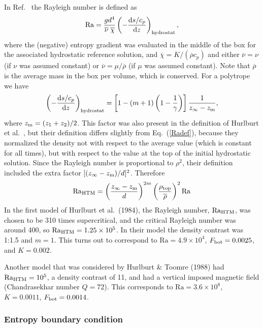 \documentclass[\mydriver,12pt,twoside,notitlepage,a4paper]{article}
\newcommand{\Ra}            {\mathrm{Ra}}
\begin{document}
In Ref.~\cite{BJNRST96} the Rayleigh number is defined as
\begin{equation}\label{Radef}
  \Ra = {gd^4\over\overline{\nu}\;\overline{\chi}}
\left(-{\mbox{d}s/c_p\over\mbox{d}z}\right)_{\rm hydrostat},
\end{equation}
where the (negative) entropy gradient was evaluated in the middle
of the box for the associated hydrostatic reference solution, and
$\overline\chi=K/(\overline\rho c_p)$ and either $\overline\nu=\nu$
(if $\nu$ was assumed constant) or $\overline\nu=\mu/\overline\rho$
(if $\mu$ was assumed constant). Note that $\overline\rho$ is the average
mass in the box per volume, which is conserved. For a polytrope we have
\begin{equation}\label{sgradient}
\left(-{\mbox{d}s/c_p\over\mbox{d}z}\right)_{\rm hydrostat}
=\left[1-(m+1)\left(1-{1\over\gamma}\right)\right]
{1\over z_{\infty}-z_{\rm m}},
\end{equation}
where $z_{\rm m}=(z_1+z_2)/2$. This factor was also present in
the definition of Hurlburt et al.\ \cite{HTM84}, but their definition
differs slightly from Eq.~(\ref{Radef}), because they normalized the
density not with respect to the average value (which is constant for
all times), but with respect to the value at the top of the initial
hydrostatic solution. Since the Rayleigh number is
proportional to $\rho^2$, their definition included the extra factor
$[(z_{\infty}-z_{\rm m})/d]^2$. Therefore
\begin{equation}\label{Rdef}
  \Ra_{\rm HTM}=\left({z_{\infty}-z_{\rm m}\over d}\right)^{2m}
  \left({\rho_{\rm top}\over\overline\rho}\right)^2\Ra
\end{equation}
In the first model of Hurlburt et al.\ (1984), the Rayleigh
number, $\Ra_{\rm HTM}$, was chosen to be 310 times supercritical,
and the critical Rayleigh number was around 400, so
$\Ra_{\rm HTM}=1.25\times10^5$. In their model the density contrast
was 1:1.5 and $m=1$. This turns out to correspond to $\Ra=4.9\times10^4$,
$F_{\rm bot}=0.0025$, and $K=0.002$.

Another model that was considered by Hurlburt \& Toomre (1988) had
$\Ra_{\rm HTM}=10^5$, a density contrast of 11, and had a vertical imposed
magnetic field (Chandrasekhar number $Q=72$). This corresponds to
$\Ra=3.6\times10^8$, $K=0.0011$, $F_{\rm bot}=0.0014$.

\subsubsection{Entropy boundary condition}
\end{document}

